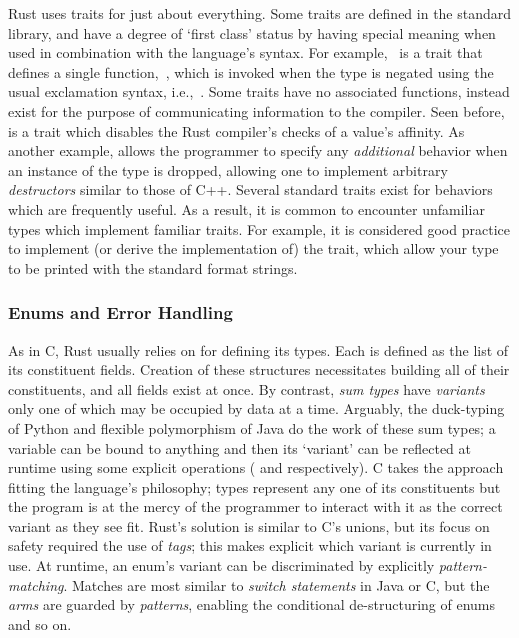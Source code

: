 Rust uses traits for just about everything. Some traits are defined in the standard library, and have a degree of `first class' status by having special meaning when used in combination with the language's syntax. For example,~ is a trait that defines a single function,~, which is invoked when the type is negated using the usual exclamation syntax, i.e.,\ . Some traits have no associated functions, instead exist for the purpose of communicating information to the compiler. Seen before,~ is a trait which disables the Rust compiler's checks of a value's affinity. As another example,  allows the programmer to specify any \textit{additional} behavior when an instance of the type is dropped, allowing one to implement arbitrary \textit{destructors} similar to those of C++. Several standard traits exist for behaviors which are frequently useful. As a result, it is common to encounter unfamiliar types which implement familiar traits. For example, it is considered good practice to implement (or derive the implementation of) the  trait, which allow your type to be printed with the standard format strings. 

\subsubsection{Enums and Error Handling}
As in C, Rust usually relies on  for defining its types. Each is defined as the list of its constituent fields. Creation of these structures necessitates building all of their constituents, and all fields exist at once. By contrast, \textit{sum types} have \textit{variants} only one of which may be occupied by data at a time. Arguably, the duck-typing of Python and flexible polymorphism of Java do the work of these sum types; a variable can be bound to anything and then its `variant' can be reflected at runtime using some explicit operations ( and  respectively). C takes the approach fitting the language's philosophy;  types represent any one of its constituents but the program is at the mercy of the programmer to interact with it as the correct variant as they see fit. Rust's solution is similar to C's unions, but its focus on safety required the use of \textit{tags}; this makes explicit which variant is currently in use. At runtime, an enum's variant can be discriminated by explicitly \textit{pattern-matching}. Matches are most similar to \textit{switch statements} in Java or C, but the \textit{arms} are guarded by \textit{patterns}, enabling the conditional de-structuring of enums and so on.

